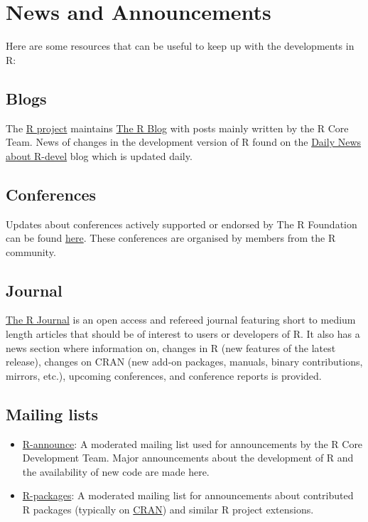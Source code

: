 \documentclass[
]{book}
\providecommand{\tightlist}{%
  \setlength{\itemsep}{0pt}\setlength{\parskip}{0pt}}
\begin{document}
\chapter{News and Announcements}\label{News}

Here are some resources that can be useful to keep up with the developments in R:

\section{Blogs}\label{blogs}

The \href{https://www.r-project.org/}{R project} maintains \href{https://blog.r-project.org/}{The R Blog} with posts mainly written by the R Core Team. News of changes in the development version of R found on the \href{https://developer.r-project.org/blosxom.cgi/R-devel}{Daily News about R-devel} blog which is updated daily.

\section{Conferences}\label{conferences}

Updates about conferences actively supported or endorsed by The R Foundation can be found \href{https://www.r-project.org/conferences/}{here}. These conferences are organised by members from the R community.

\section{Journal}\label{journal}

\href{https://journal.r-project.org/}{The R Journal} is an open access and refereed journal featuring short to medium length articles that should be of interest to users or developers of R. It also has a news section where information on, changes in R (new features of the latest release), changes on CRAN (new add-on packages, manuals, binary contributions, mirrors, etc.), upcoming conferences, and conference reports is provided.

\section{Mailing lists}\label{mailing-lists-1}

\begin{itemize}
\tightlist
\item
  \href{https://stat.ethz.ch/mailman/listinfo/r-announce}{R-announce}: A moderated mailing list used for announcements by the R Core Development Team. Major announcements about the development of R and the availability of new code are made here.
\item
  \href{https://stat.ethz.ch/mailman/listinfo/r-packages}{R-packages}: A moderated mailing list for announcements about contributed R packages (typically on \href{https://cran.r-project.org/}{CRAN}) and similar R project extensions.
\end{itemize}
\end{document}
